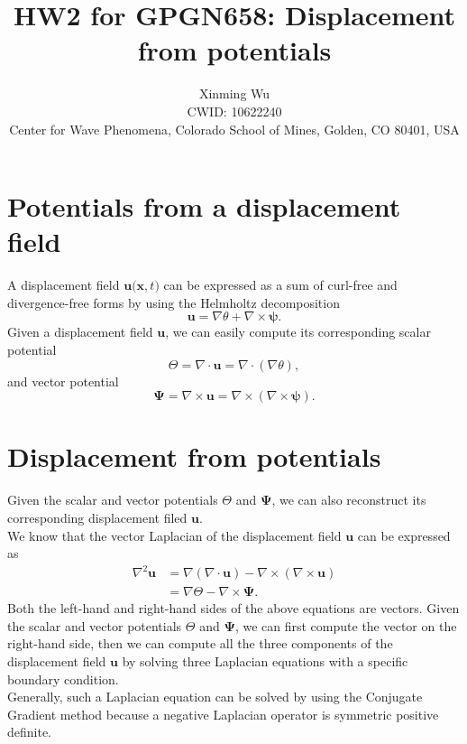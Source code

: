 \documentclass[referee]{../../../texCls/mayWithTeaser}
\begin{document}
\title{HW2 for GPGN658: Displacement from potentials}
\author[X.~Wu]
{Xinming Wu\\
CWID: 10622240\\
Center for Wave Phenomena, Colorado School of Mines, Golden, CO 80401, USA}
\maketitle
\section{Potentials from a displacement field}
A displacement field $\mathbf{u(x},t)$ can be expressed as a sum of curl-free
and divergence-free forms by using the Helmholtz decomposition
\begin{equation}
  \mathbf{u} = \nabla\theta+\nabla\times\boldsymbol{\psi}.
\end{equation}
Given a displacement field $\mathbf{u}$, we can easily compute its corresponding
scalar potential
\begin{equation}
  \Theta=\nabla\cdot\mathbf{u}=\nabla\cdot(\nabla\theta),
\end{equation}
and vector potential
\begin{equation}
  \boldsymbol{\Psi}=\nabla\times\mathbf{u}=\nabla\times(\nabla\times\boldsymbol{\psi}).
\end{equation}
\section{Displacement from potentials}
Given the scalar and vector potentials $\Theta$ and $\boldsymbol{\Psi}$, we can
also reconstruct its corresponding displacement filed $\mathbf{u}$.\\
We know that the vector Laplacian of the displacement field $\mathbf{u}$ can be
expressed as
\begin{equation}
\begin{split}
  \nabla^2\mathbf{u}&=\nabla(\nabla\cdot\mathbf{u})-\nabla\times(\nabla\times\mathbf{u})\\
  &=\nabla\Theta-\nabla\times\boldsymbol{\Psi}.
\end{split}
\end{equation}
Both the left-hand and right-hand sides of the above equations are vectors.
Given the scalar and vector potentials $\Theta$ and $\boldsymbol{\Psi}$, we can
first compute the vector on the right-hand side, then we can compute all the
three components of the displacement field $\mathbf{u}$ by solving three Laplacian 
equations with a specific boundary condition.\\
Generally, such a Laplacian equation can be solved by using the Conjugate
Gradient method because a negative Laplacian operator is symmetric positive
definite. 
\end{document}
